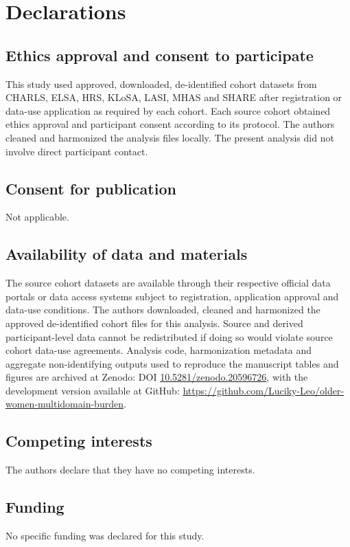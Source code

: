 \documentclass[pdflatex,sn-vancouver-num]{sn-jnl}
\begin{document}
\section*{Declarations}

\subsection*{Ethics approval and consent to participate}
This study used approved, downloaded, de-identified cohort datasets from CHARLS, ELSA, HRS, KLoSA, LASI, MHAS and SHARE after registration or data-use application as required by each cohort. Each source cohort obtained ethics approval and participant consent according to its protocol. The authors cleaned and harmonized the analysis files locally. The present analysis did not involve direct participant contact.

\subsection*{Consent for publication}
Not applicable.

\subsection*{Availability of data and materials}
The source cohort datasets are available through their respective official data portals or data access systems subject to registration, application approval and data-use conditions. The authors downloaded, cleaned and harmonized the approved de-identified cohort files for this analysis. Source and derived participant-level data cannot be redistributed if doing so would violate source cohort data-use agreements. Analysis code, harmonization metadata and aggregate non-identifying outputs used to reproduce the manuscript tables and figures are archived at Zenodo: DOI \href{https://doi.org/10.5281/zenodo.20596726}{10.5281/zenodo.20596726}, with the development version available at GitHub: \url{https://github.com/Luciky-Leo/older-women-multidomain-burden}.

\subsection*{Competing interests}
The authors declare that they have no competing interests.

\subsection*{Funding}
No specific funding was declared for this study.
\end{document}
